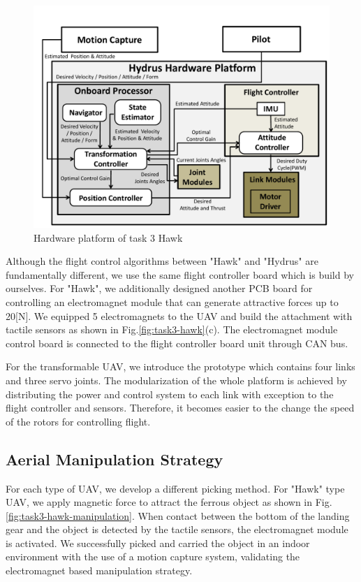 \documentclass{standalone}
\begin{document}
\begin{figure}[h]
  \begin{center}
    \includegraphics[clip,  bb=0 0 720 540,  width=\columnwidth]{sections/task3/images/hydrus-platform.pdf}
    \caption{Hardware platform of task 3 Hawk}
    \label{fig:task3-hydrus-platform}
  \end{center}
\end{figure} 



Although the flight control algorithms between "Hawk" and "Hydrus" are fundamentally different, we use the same flight controller board which is build by ourselves. For "Hawk", we additionally designed another PCB board for controlling an electromagnet module that can generate attractive forces up to 20[N]. We equipped 5 electromagnets to the UAV and build the attachment with tactile sensors as shown in Fig.\ref{fig:task3-hawk}(c). The electromagnet module control board is connected to the flight  controller board unit through CAN bus.

For the transformable UAV, we introduce the prototype which contains four links and three servo joints. The modularization of the whole platform is achieved by distributing the power and control system to each link with exception to the flight controller and sensors. Therefore, it becomes easier to the change the speed of the rotors for controlling flight.

\subsection{Aerial Manipulation Strategy}
For each type of UAV, we develop a different picking method. For "Hawk" type UAV, we apply magnetic force to attract the ferrous object as shown in Fig.\ref{fig:task3-hawk-manipulation}. When contact between the bottom of the landing gear and the object is detected by the tactile sensors, the electromagnet module is activated. We successfully picked and carried the object in an indoor environment with the use of a motion capture system, validating the electromagnet based manipulation strategy.
\end{document}
